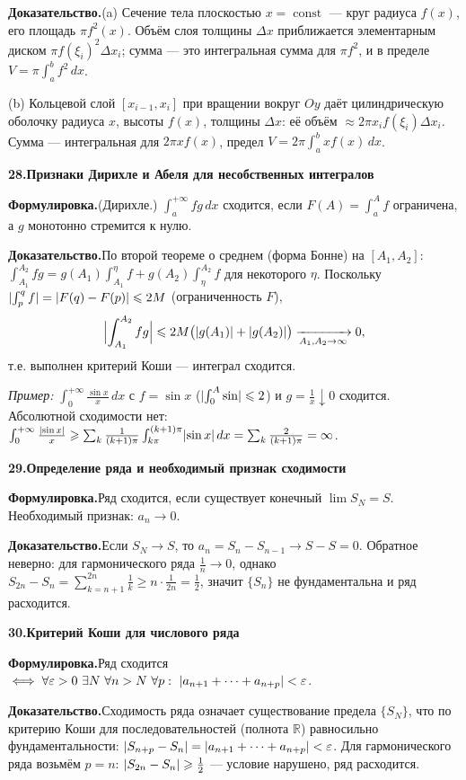 \documentclass[10pt,a4paper]{article}
\DeclareMathOperator{\Const}{const}
\newcommand{\R}{\mathbb{R}}
\newcommand{\dx}{\,dx}
\newcommand{\eps}{\varepsilon}
\renewcommand{\le}{\leqslant}
\renewcommand{\ge}{\geqslant}
\DeclarePairedDelimiter{\abs}{\lvert}{\rvert}
\theoremstyle{definition}
\theoremstyle{plain}
\newcommand{\writespace}{\vspace{7.5mm}}
\newcommand{\prf}[2]{%
  \par\writespace\noindent
  {\large\bfseries\color{accent}#1.\enspace #2}\par\smallskip}
\newcommand{\stmt}{\par\noindent\textbf{Формулировка.}\enspace}
\newcommand{\dok}{\par\noindent\textbf{Доказательство.}\enspace}
\begin{document}
\dok (a) Сечение тела плоскостью $x=\Const$ — круг радиуса $f(x)$, его площадь $\pi f^2(x)$. Объём
слоя толщины $\Delta x$ приближается элементарным диском $\pi f(\xi_i)^2\Delta x_i$; сумма — это
интегральная сумма для $\pi f^2$, и в пределе $V=\pi\int_a^b f^2\dx$.

(b) Кольцевой слой $[x_{i-1},x_i]$ при вращении вокруг $Oy$ даёт цилиндрическую оболочку радиуса
$x$, высоты $f(x)$, толщины $\Delta x$: её объём $\approx2\pi x_i f(\xi_i)\Delta x_i$. Сумма —
интегральная для $2\pi x f(x)$, предел $V=2\pi\int_a^b x f(x)\dx$.

\prf{28}{Признаки Дирихле и Абеля для несобственных интегралов}
\stmt (Дирихле.) $\int_a^{+\infty}f g\dx$ сходится, если $F(A)=\int_a^A f$ ограничена, а $g$
монотонно стремится к нулю.

\dok По второй теореме о среднем (форма Бонне) на $[A_1,A_2]$:
$\int_{A_1}^{A_2}fg=g(A_1)\int_{A_1}^{\eta}f+g(A_2)\int_{\eta}^{A_2}f$ для некоторого $\eta$.
Поскольку $\abs{\int_{p}^{q}f}=\abs{F(q)-F(p)}\le2M$ (ограниченность $F$),
\[
  \abs[\Big]{\int_{A_1}^{A_2}fg}\le2M\bigl(\abs{g(A_1)}+\abs{g(A_2)}\bigr)\xrightarrow[A_1,A_2\to\infty]{}0,
\]
т.е. выполнен критерий Коши — интеграл сходится.

\emph{Пример:} $\int_0^{+\infty}\tfrac{\sin x}{x}\dx$
с $f=\sin x$ ($\abs{\int_0^A\sin}\le2$) и $g=\tfrac1x\downarrow0$ сходится. Абсолютной сходимости
нет: $\int_0^{+\infty}\tfrac{\abs{\sin x}}{x}\ge\sum_{k}\tfrac1{(k+1)\pi}\int_{k\pi}^{(k+1)\pi}\abs{\sin x}\dx
=\sum_k\tfrac{2}{(k+1)\pi}=\infty$.

\prf{29}{Определение ряда и необходимый признак сходимости}
\stmt Ряд сходится, если существует конечный $\lim S_N=S$. Необходимый признак: $a_n\to0$.

\dok Если $S_N\to S$, то $a_n=S_n-S_{n-1}\to S-S=0$. Обратное неверно: для гармонического ряда
$\tfrac1n\to0$, однако
$S_{2n}-S_n=\sum_{k=n+1}^{2n}\tfrac1k\ge n\cdot\tfrac1{2n}=\tfrac12$, значит $\{S_n\}$ не
фундаментальна и ряд расходится.

\prf{30}{Критерий Коши для числового ряда}
\stmt Ряд сходится $\iff\forall\eps>0\ \exists N\ \forall n>N\ \forall p:\
\abs{a_{n+1}+\dots+a_{n+p}}<\eps$.

\dok Сходимость ряда означает существование предела $\{S_N\}$, что по критерию Коши для
последовательностей (полнота $\R$) равносильно фундаментальности:
$\abs{S_{n+p}-S_n}=\abs{a_{n+1}+\dots+a_{n+p}}<\eps$. Для гармонического ряда возьмём $p=n$:
$\abs{S_{2n}-S_n}\ge\tfrac12$ — условие нарушено, ряд расходится.
\end{document}
